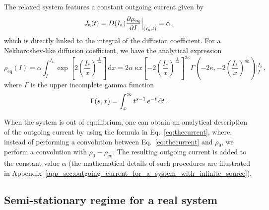 The relaxed system features a constant outgoing current given by
\begin{equation}
    J_\mathrm{a}(t) = D(I_\mathrm{a})\pdv{\rho_\text{eq}}{I}\Bigr|_{(I_\mathrm{a},t)} = \alpha\,,
    \label{eq:equilibrium_stationary_current}
\end{equation} 
which is directly linked to the integral of the diffusion coefficient. For a Nekhoroshev-like diffusion coefficient, we have the analytical expression
\begin{equation}
    \rho_\text{eq}(I) = \alpha \int_I^{I_\mathrm{a}} \exp\left[2\left(\frac{I_\ast}{x}\right)^{\frac{1}{2\kappa}}\right] \,\mathrm{d}x 
    = 2\alpha\ \kappa x \left[-2\left(\frac{I_\ast}{x}\right)^{\frac{1}{2\kappa}}\right]^{2\kappa} \Gamma\left(-2\kappa, -2\left(\frac{I_\ast}{x}\right)^{\frac{1}{2\kappa}}\right)\Bigg|_I^{I_\mathrm{a}}\,,
\end{equation}
where $\Gamma$ is the upper incomplete gamma function
\begin{equation}
    \Gamma(s,x) = \int_x^{\infty} t^{s-1}\,e^{-t}\,{\rm d}t \,.
\end{equation}

When the system is out of equilibrium, one can obtain an analytical description of the outgoing current by using the formula in Eq.~\eqref{eq:thecurrent}, where, instead of performing a convolution between Eq.~\eqref{eq:thecurrent} and $\rho_0$, we perform a convolution with $\rho_0 - \rho_\text{eq}$. The resulting outgoing current is added to the constant value $\alpha$ (the mathematical details of such procedures are illustrated in Appendix~\ref{app_sec:outgoing_current_for_a_system_with_infinite_source}).


\subsection{Semi-stationary regime for a real system}
\label{subsec:semi_stationary_regime_for_a_real_system}


